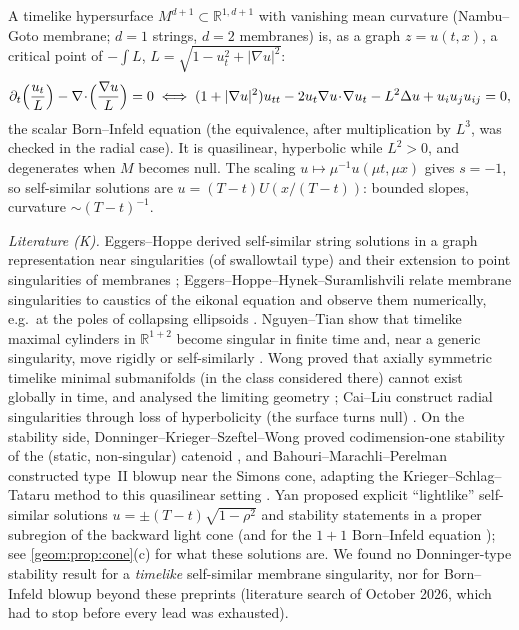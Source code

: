 A timelike hypersurface $M^{d+1}\subset\mathbb{R}^{1,d+1}$ with vanishing
mean curvature (Nambu--Goto membrane; $d=1$ strings, $d=2$ membranes) is,
as a graph $z=u(t,x)$, a critical point of $-\int L$,
$L=\sqrt{1-u_t^2+|\nabla u|^2}$:
\begin{equation}\label{geom:eq:BI}
  \partial_t\Bigl(\frac{u_t}{L}\Bigr)-\nabla\!\cdot\!\Bigl(\frac{\nabla u}{L}\Bigr)=0
  \iff
  (1+|\nabla u|^2)u_{tt}-2u_t\nabla u\!\cdot\!\nabla u_t-L^2\Delta u+u_iu_ju_{ij}=0 ,
\end{equation}
the scalar Born--Infeld equation (the equivalence, after multiplication by
$L^3$, was checked in the radial case). It is quasilinear, hyperbolic
while $L^2>0$, and degenerates when $M$ becomes null. The scaling
$u\mapsto\mu^{-1}u(\mu t,\mu x)$ gives $s=-1$, so self-similar solutions are
$u=(T-t)U(x/(T-t))$: bounded slopes, curvature $\sim(T-t)^{-1}$.

\emph{Literature (K).} Eggers--Hoppe derived self-similar string solutions
in a graph representation near singularities (of swallowtail type) and their
extension to point singularities of membranes \cite{EggersHoppe2009};
Eggers--Hoppe--Hynek--Suramlishvili relate membrane singularities to
caustics of the eikonal equation and observe them numerically, e.g.\ at the
poles of collapsing ellipsoids \cite{EggersEtAl2015}. Nguyen--Tian show that
timelike maximal cylinders in $\mathbb{R}^{1+2}$ become singular in finite
time and, near a generic singularity, move rigidly or self-similarly
\cite{NguyenTian2013}. Wong proved that axially symmetric timelike minimal submanifolds (in the
class considered there) cannot exist globally in time, and analysed the
limiting geometry \cite{Wong2018}; Cai--Liu
construct radial singularities through loss of hyperbolicity (the surface
turns null) \cite{CaiLiu2025}. On the stability side,
Donninger--Krieger--Szeftel--Wong proved codimension-one stability of the
(static, non-singular) catenoid \cite{DonningerEtAl2016}, and
Bahouri--Marachli--Perelman constructed type~II blowup near the Simons cone,
adapting the Krieger--Schlag--Tataru method to this quasilinear setting
\cite{BahouriMarachliPerelman2021}. Yan proposed explicit ``lightlike''
self-similar solutions $u=\pm(T-t)\sqrt{1-\rho^2}$ and stability statements
in a proper subregion of the backward light cone
\cite{Yan2017,Yan2019b} (and for the $1{+}1$ Born--Infeld equation
\cite{Yan2019a}); see \cref{geom:prop:cone}(c) for what these solutions
are. We found no Donninger-type stability result for a \emph{timelike}
self-similar membrane singularity, nor for Born--Infeld blowup beyond
these preprints (literature search of October 2026, which had to stop
before every lead was exhausted).

